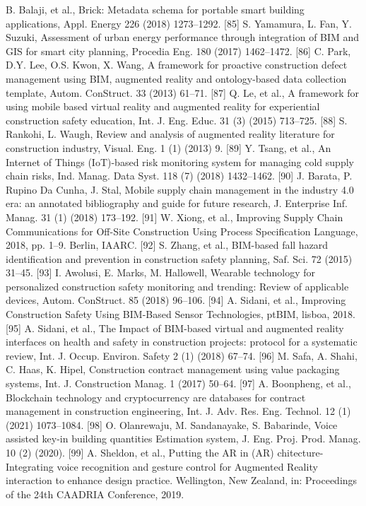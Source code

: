 \documentclass[towcolumn, 11pt]{Article}
\begin{document}
\begin{چکیده}
[84] B. Balaji, et al., Brick: Metadata schema for portable smart building applications, Appl. Energy 226 (2018) 1273–1292. 
[85] S. Yamamura, L. Fan, Y. Suzuki, Assessment of urban energy performance through integration of BIM and GIS for smart city planning, Procedia Eng. 180 (2017) 1462–1472. 
[86] C. Park, D.Y. Lee, O.S. Kwon, X. Wang, A framework for proactive construction defect management using BIM, augmented reality and ontology-based data collection template, Autom. ConStruct. 33 (2013) 61–71. 
[87] Q. Le, et al., A framework for using mobile based virtual reality and augmented reality for experiential construction safety education, Int. J. Eng. Educ. 31 (3) (2015) 713–725. 
[88] S. Rankohi, L. Waugh, Review and analysis of augmented reality literature for construction industry, Visual. Eng. 1 (1) (2013) 9. 
[89] Y. Tsang, et al., An Internet of Things (IoT)-based risk monitoring system for managing cold supply chain risks, Ind. Manag. Data Syst. 118 (7) (2018) 1432–1462. 
[90] J. Barata, P. Rupino Da Cunha, J. Stal, Mobile supply chain management in the industry 4.0 era: an annotated bibliography and guide for future research, J. Enterprise Inf. Manag. 31 (1) (2018) 173–192. 
[91] W. Xiong, et al., Improving Supply Chain Communications for Off-Site Construction Using Process Specification Language, 2018, pp. 1–9. Berlin, IAARC. 
[92] S. Zhang, et al., BIM-based fall hazard identification and prevention in construction safety planning, Saf. Sci. 72 (2015) 31–45. 
[93] I. Awolusi, E. Marks, M. Hallowell, Wearable technology for personalized construction safety monitoring and trending: Review of applicable devices, Autom. ConStruct. 85 (2018) 96–106. 
[94] A. Sidani, et al., Improving Construction Safety Using BIM-Based Sensor Technologies, ptBIM, lisboa, 2018. 
[95] A. Sidani, et al., The Impact of BIM-based virtual and augmented reality interfaces on health and safety in construction projects: protocol for a systematic review, Int. J. Occup. Environ. Safety 2 (1) (2018) 67–74. 
[96] M. Safa, A. Shahi, C. Haas, K. Hipel, Construction contract management using value packaging systems, Int. J. Construction Manag. 1 (2017) 50–64. 
[97] A. Boonpheng, et al., Blockchain technology and cryptocurrency are databases for contract management in construction engineering, Int. J. Adv. Res. Eng. Technol. 12 (1) (2021) 1073–1084. 
[98] O. Olanrewaju, M. Sandanayake, S. Babarinde, Voice assisted key-in building quantities Estimation system, J. Eng. Proj. Prod. Manag. 10 (2) (2020). 
[99] A. Sheldon, et al., Putting the AR in (AR) chitecture-Integrating voice recognition and gesture control for Augmented Reality interaction to enhance design practice. Wellington, New Zealand, in: Proceedings of the 24th CAADRIA Conference, 2019. 

\end{چکیده}
\end{document}
